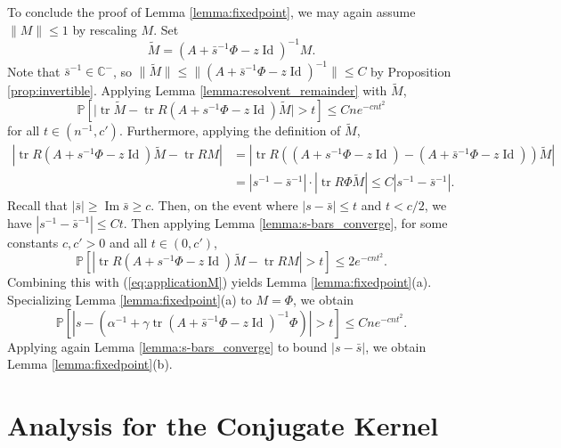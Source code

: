 \documentclass{article}
\theoremstyle{definition}
\newcommand{\C}{\mathbb{C}}
\newcommand{\Id}{\operatorname{Id}}
\newcommand{\tr}{\operatorname{tr}}
\newcommand{\wM}{\widetilde{M}}
\renewcommand{\P}{\mathbb{P}}
\newcommand{\1}{\mathbf{1}}
\renewcommand{\Im}{\operatorname{Im}}
\begin{document}
To conclude the proof of Lemma \ref{lemma:fixedpoint}, we may again assume
$\|M\| \leq 1$ by rescaling $M$. Set
\[\wM=\left(A+\bar{s}^{-1}\Phi-z\Id\right)^{-1}M.\]
Note that $\bar{s}^{-1} \in \C^-$, so $\|\wM\| \leq
\|(A+\bar{s}^{-1}\Phi-z\Id)^{-1}\| \leq C$ by Proposition \ref{prop:invertible}.
Applying Lemma \ref{lemma:resolvent_remainder} with $\wM$,
\begin{equation}\label{eq:applicationM}
\P\left[\Big|\tr \wM-\tr R\left(A+s^{-1}
\Phi-z\Id\right)\wM\Big|>t\right] \leq Cne^{-cnt^2}
\end{equation}
for all $t \in (n^{-1},c')$.
Furthermore, applying the definition of $\wM$,
\begin{align*}
|\tr R\left(A+s^{-1} \Phi-z\Id\right)\wM-\tr RM|
&=\left|\tr R\left(\left(A+s^{-1} \Phi-z\Id\right)
-\left(A+\bar{s}^{-1} \Phi-z\Id\right)\right)\wM\right|\\
&=|s^{-1}-\bar{s}^{-1}| \cdot |\tr R\Phi\wM|
\leq C|s^{-1}-\bar{s}^{-1}|.
\end{align*}
Recall that $|\bar{s}| \geq \Im \bar{s} \geq c$.
Then, on the event where $|s-\bar{s}| \leq t$ and $t<c/2$, we have
$|s^{-1}-\bar{s}^{-1}| \leq Ct$. Then
applying Lemma \ref{lemma:s-bars_converge},
for some constants $c,c'>0$ and all $t \in (0,c')$,
\[\P\left[|\tr R\left(A+s^{-1} \Phi-z\Id\right)\wM-\tr
RM|>t \right] \leq 2e^{-cnt^2}.\]
Combining this with (\ref{eq:applicationM}) yields Lemma
\ref{lemma:fixedpoint}(a). Specializing Lemma \ref{lemma:fixedpoint}(a)
to $M=\Phi$, we obtain
\[\P\left[\left|s-\left(\alpha^{-1}+\gamma
\tr(A+\bar{s}^{-1}\Phi-z\Id)^{-1}\Phi\right)\right|>t\right]
\leq Cne^{-cnt^2}.\]
Applying again Lemma \ref{lemma:s-bars_converge} to bound $|s-\bar{s}|$, we
obtain Lemma \ref{lemma:fixedpoint}(b).

\section{Analysis for the Conjugate Kernel}\label{appendix:CK}
\end{document}
